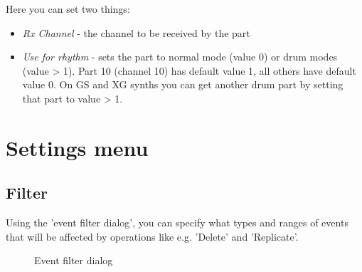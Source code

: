 \documentclass[letterpaper]{report}
\begin{document}
Here you can set two things:

\begin{itemize}
\item {\em Rx Channel} - the channel to be received by the part
\item {\em Use for rhythm} - sets the part to normal mode (value 0)
or drum modes (value > 1). Part 10 (channel 10) has default value 1,
all others have default value 0. On GS and XG synths you can get another drum
part by setting that part to value > 1.
\end{itemize}

\section{Settings menu}\label{twsettings}

\subsection{Filter}\label{midifilter}

Using the 'event filter dialog', you can specify what types and ranges of
events that will be affected by  operations like
e.g. 'Delete' and 'Replicate'.

\begin{figure}
\caption{Event filter dialog}
\end{figure}
\end{document}
